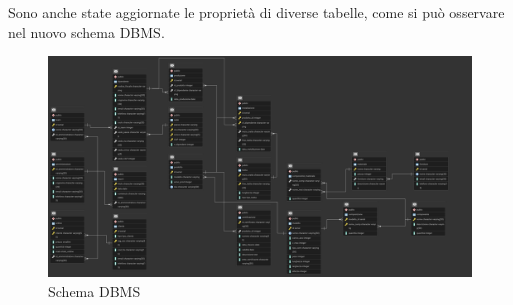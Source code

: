\documentclass{article}
\begin{document}
\noindent Sono anche state aggiornate le proprietà di diverse tabelle, come si può osservare nel nuovo schema DBMS.

\newpage
\begin{figure}[H]
    \centering
    \includegraphics[width=23cm, angle=-90]{images/DBMS.png}
    \caption{Schema DBMS}
\end{figure}







\newpage
{}



\end{document}
